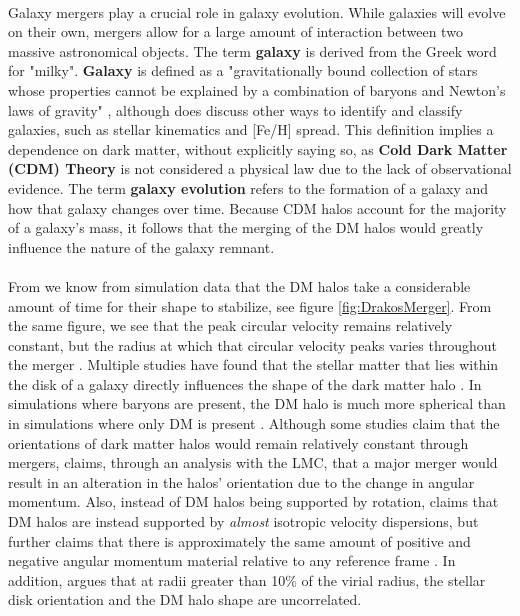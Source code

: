\documentclass[fleqn,usenatbib]{mnras}
\begin{document}
\paragraph{} Galaxy mergers play a crucial role in galaxy evolution. While galaxies will evolve on their own, mergers allow for a large amount of interaction between two massive astronomical objects. The term \textbf{galaxy} is derived from the Greek word for "milky". \textbf{Galaxy} is defined as a "gravitationally bound collection of stars whose properties cannot be explained by a combination of baryons and Newton's laws of gravity" \citep{Willman+2012}, although \cite{Willman+2012} does discuss other ways to identify and classify galaxies, such as stellar kinematics and [Fe/H] spread. This definition implies a dependence on dark matter, without explicitly saying so, as \textbf{Cold Dark Matter (CDM) Theory} is not considered a physical law due to the lack of observational evidence. The term \textbf{galaxy evolution} refers to the formation of a galaxy and how that galaxy changes over time. Because CDM halos account for the majority of a galaxy's mass, it follows that the merging of the DM halos would greatly influence the nature of the galaxy remnant.

\paragraph{} From \citep{Drakos+2019} we know from simulation data that the DM halos take a considerable amount of time for their shape to stabilize, see figure \ref{fig:DrakosMerger}. From the same figure, we see that the peak circular velocity remains relatively constant, but the radius at which that circular velocity peaks varies throughout the merger \citep{Drakos+2019}. Multiple studies have found that the stellar matter that lies within the disk of a galaxy directly influences the shape of the dark matter halo \citep{Prada+2019}. In simulations where baryons are present, the DM halo is much more spherical than in simulations where only DM is present \citep{Chua+2019}. Although some studies claim that the orientations of dark matter halos would remain relatively constant through mergers, \cite{Baptista+2023} claims, through an analysis with the LMC, that a major merger would result in an alteration in the halos' orientation due to the change in angular momentum. Also, instead of DM halos being supported by rotation, \cite{Diemand+2011} claims that DM halos are instead supported by \textit{almost} isotropic velocity dispersions, but further claims that there is approximately the same amount of positive and negative angular momentum material relative to any reference frame \citep{Diemand+2011}. In addition, \cite{Diemand+2011} argues that at radii greater than 10\% of the virial radius, the stellar disk orientation and the DM halo shape are uncorrelated.
\end{document}
